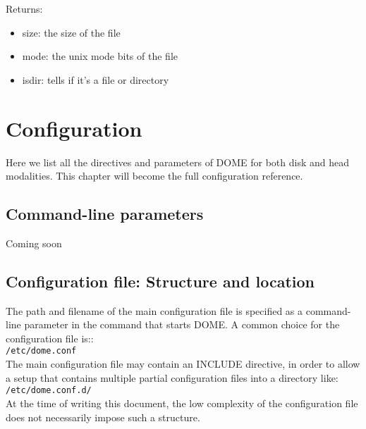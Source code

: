 \documentclass[a4paper,10pt]{scrreprt}
\begin{document}
Returns:
\begin{itemize}
 \item size: the size of the file
 \item mode: the unix mode bits of the file
 \item isdir: tells if it's a file or directory
\end{itemize}




















\chapter{Configuration}
Here we list all the directives and parameters of DOME for both disk and head modalities. This chapter will become the full configuration reference.\\

\section{Command-line parameters}

Coming soon\\

\section{Configuration file: Structure and location}
The path and filename of the main configuration file is specified as a command-line parameter in the command that starts DOME. A common
choice for the configuration file is::\\

\lstinline"/etc/dome.conf"\\

The main configuration file may contain an INCLUDE directive, in order to allow a setup that contains multiple partial configuration files into a directory like:\\

\lstinline"/etc/dome.conf.d/"\\

At the time of writing this document, the low complexity of the configuration file does not necessarily impose such a structure.
\end{document}

